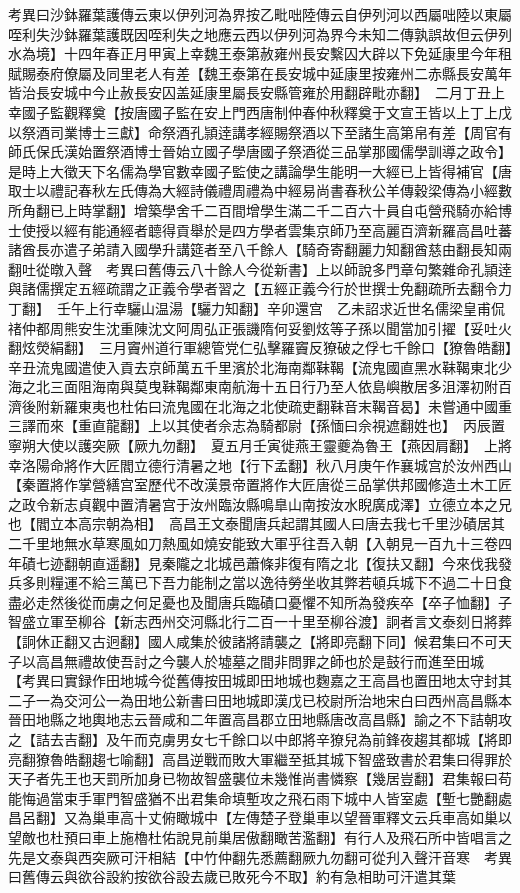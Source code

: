 考異曰沙鉢羅葉護傳云東以伊列河為界按乙毗咄陸傳云自伊列河以西屬咄陸以東屬咥利失沙鉢羅葉護既因咥利失之地應云西以伊列河為界今未知二傳孰誤故但云伊列水為境】十四年春正月甲寅上幸魏王泰第赦雍州長安繫囚大辟以下免延康里今年租賦賜泰府僚屬及同里老人有差【魏王泰第在長安城中延康里按雍州二赤縣長安萬年皆治長安城中今止赦長安囚盖延康里屬長安縣管雍於用翻辟毗亦翻】　二月丁丑上幸國子監觀釋奠【按唐國子監在安上門西唐制仲春仲秋釋奠于文宣王皆以上丁上戊以祭酒司業博士三獻】命祭酒孔頴逹講孝經賜祭酒以下至諸生高第帛有差【周官有師氏保氏漢始置祭酒博士晉始立國子學唐國子祭酒從三品掌那國儒學訓導之政令】是時上大徵天下名儒為學官數幸國子監使之講論學生能明一大經已上皆得補官【唐取士以禮記春秋左氏傳為大經詩儀禮周禮為中經易尚書春秋公羊傳穀梁傳為小經數所角翻已上時掌翻】增築學舍千二百間增學生滿二千二百六十員自屯營飛騎亦給博士使授以經有能通經者聼得貢舉於是四方學者雲集京師乃至高麗百濟新羅高昌吐蕃諸酋長亦遣子弟請入國學升講筵者至八千餘人【騎奇寄翻麗力知翻酋慈由翻長知兩翻吐從暾入聲　考異曰舊傳云八十餘人今從新書】上以師說多門章句繁雜命孔頴逹與諸儒撰定五經疏謂之正義令學者習之【五經正義今行於世撰士免翻疏所去翻令力丁翻】　壬午上行幸驪山温湯【驪力知翻】辛卯還宫　乙未詔求近世名儒梁皇甫侃禇仲都周熊安生沈重陳沈文阿周弘正張譏隋何妥劉炫等子孫以聞當加引擢【妥吐火翻炫熒絹翻】　三月竇州道行軍總管党仁弘擊羅竇反獠破之俘七千餘口【獠魯皓翻】　辛丑流鬼國遣使入貢去京師萬五千里濱於北海南鄰靺鞨【流鬼國直黑水靺鞨東北少海之北三面阻海南與莫曳靺鞨鄰東南航海十五日行乃至人依島嶼散居多沮澤初附百濟後附新羅東夷也杜佑曰流鬼國在北海之北使疏吏翻靺音末鞨音曷】未嘗通中國重三譯而來【重直龍翻】上以其使者佘志為騎都尉【孫愐曰佘視遮翻姓也】　丙辰置寧朔大使以護突厥【厥九勿翻】　夏五月壬寅徙燕王靈夔為魯王【燕因肩翻】　上將幸洛陽命將作大匠閻立德行清暑之地【行下孟翻】秋八月庚午作襄城宫於汝州西山【秦置將作掌營繕宫室歷代不改漢景帝置將作大匠唐從三品掌供邦國修造土木工匠之政令新志貞觀中置清暑宫于汝州臨汝縣鳴臯山南按汝水睨廣成澤】立德立本之兄也【閻立本高宗朝為相】　高昌王文泰聞唐兵起謂其國人曰唐去我七千里沙磧居其二千里地無水草寒風如刀熱風如燒安能致大軍乎往吾入朝【入朝見一百九十三卷四年磧七迹翻朝直遥翻】見秦隴之北城邑蕭條非復有隋之北【復扶又翻】今來伐我發兵多則糧運不給三萬已下吾力能制之當以逸待勞坐收其弊若頓兵城下不過二十日食盡必走然後從而虜之何足憂也及聞唐兵臨磧口憂懼不知所為發疾卒【卒子恤翻】子智盛立軍至柳谷【新志西州交河縣北行二百一十里至柳谷渡】詗者言文泰刻日將葬【詗休正翻又古迥翻】國人咸集於彼諸將請襲之【將即亮翻下同】候君集曰不可天子以高昌無禮故使吾討之今襲人於墟墓之間非問罪之師也於是鼓行而進至田城　【考異曰實録作田地城今從舊傳按田城即田地城也麴嘉之王高昌也置田地太守封其二子一為交河公一為田地公新書曰田地城即漢戊已校尉所治地宋白曰西州高昌縣本晉田地縣之地輿地志云晉咸和二年置高昌郡立田地縣唐改高昌縣】諭之不下詰朝攻之【詰去吉翻】及午而克虜男女七千餘口以中郎將辛獠兒為前鋒夜趨其都城【將即亮翻獠魯皓翻趨七喻翻】高昌逆戰而敗大軍繼至抵其城下智盛致書於君集曰得罪於天子者先王也天罰所加身已物故智盛襲位未幾惟尚書憐察【幾居豈翻】君集報曰苟能悔過當束手軍門智盛猶不出君集命填塹攻之飛石雨下城中人皆室處【塹七艷翻處昌呂翻】又為巢車高十丈俯瞰城中【左傳楚子登巢車以望晉軍釋文云兵車高如巢以望敵也杜預曰車上施櫓杜佑說見前巢居傲翻瞰苦濫翻】有行人及飛石所中皆唱言之先是文泰與西突厥可汗相結【中竹仲翻先悉薦翻厥九勿翻可從刋入聲汗音寒　考異曰舊傳云與欲谷設約按欲谷設去歲已敗死今不取】約有急相助可汗遣其葉